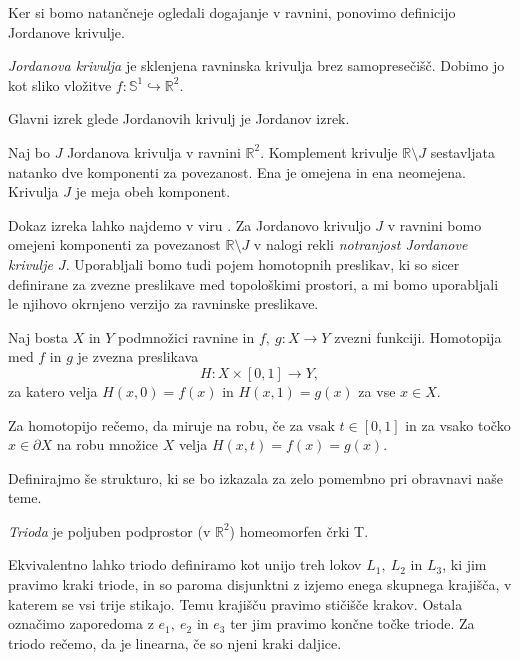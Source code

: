 \documentclass[mat1]{fmfdelo}
\newcommand{\R}{\mathbb R}
\begin{document}
Ker si bomo natančneje ogledali dogajanje v ravnini, ponovimo definicijo Jordanove krivulje.
\begin{definicija}
\emph{Jordanova krivulja} je sklenjena ravninska krivulja brez samopresečišč. Dobimo jo kot sliko vložitve $f\colon \mathbb{S}^1 \hookrightarrow \R^2$.
\end{definicija}
Glavni izrek glede Jordanovih krivulj je Jordanov izrek.
\begin{izrek}
Naj bo $J$ Jordanova krivulja v ravnini $\R^2$. Komplement krivulje $\R \setminus J$ sestavljata natanko dve komponenti za povezanost. Ena je omejena in ena neomejena. Krivulja $J$ je meja obeh komponent.
\end{izrek}
Dokaz izreka lahko najdemo v viru \cite{jordan_wiki}. Za Jordanovo krivuljo $J$ v ravnini bomo omejeni komponenti za povezanost $\R \setminus J$ v nalogi rekli \emph{notranjost Jordanove krivulje $J$}. Uporabljali bomo tudi pojem homotopnih preslikav, ki so sicer definirane za zvezne preslikave med topološkimi prostori, a mi bomo uporabljali le njihovo okrnjeno verzijo za ravninske preslikave.
\begin{definicija}
Naj bosta $X$ in $Y$ podmnožici ravnine in $f,\ g\colon X \to Y$ zvezni funkciji. Homotopija med  $f$ in $g$ je zvezna preslikava
\[
H\colon X \times [0, 1] \to Y,
\]
 za katero velja $H(x, 0) = f(x)$ in $H(x, 1) = g(x)$ za vse $x\in X$.
\end{definicija}
Za homotopijo rečemo, da miruje na robu, če za vsak $t \in [0, 1]$ in za vsako točko $x \in \partial X$ na robu množice $X$ velja $H(x, t) = f(x) = g(x)$.

Definirajmo še strukturo, ki se bo izkazala za zelo pomembno pri obravnavi naše teme.
\begin{definicija}
\emph{Trioda} je poljuben podprostor (v $\R^2$) homeomorfen črki T.
\end{definicija}
Ekvivalentno lahko triodo definiramo kot unijo treh lokov $L_1,\ L_2$ in $L_3$, ki jim pravimo kraki triode, in so paroma disjunktni z izjemo enega skupnega krajišča, v katerem se vsi trije stikajo. Temu krajišču pravimo stičišče krakov. Ostala označimo zaporedoma z $e_1,\ e_2$ in $e_3$ ter jim pravimo končne točke triode. Za triodo rečemo, da je linearna, če so njeni kraki daljice.
\end{document}
